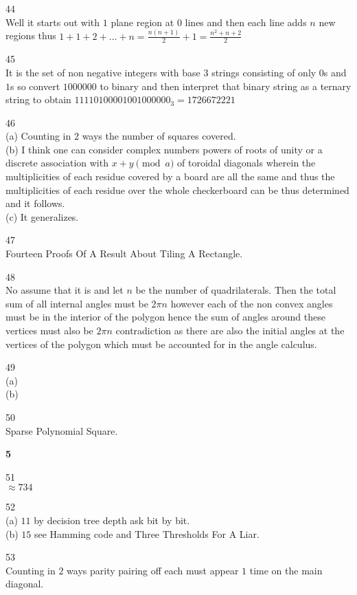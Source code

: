 44 \\
Well it starts out with $1$ plane region at $0$ lines and then each line adds $n$ new regions thus $1+1+2+\dots +n=\frac{n(n+1)}{2}+1=\boxed{\frac{n^2+n+2}{2}}$

45 \\
It is the set of non negative integers with base $3$ strings consisting of only $0$s and $1$s so convert $1000000$ to binary and then interpret that binary string as a ternary string to obtain $11110100001001000000_3=\boxed{1726672221}$

46 \\
(a) Counting in $2$ ways the number of squares covered. \\
(b) I think one can consider complex numbers powers of roots of unity or a discrete association with $x+y \pmod{a}$ of toroidal diagonals wherein the multiplicities of each residue covered by a board are all the same and thus the multiplicities of each residue over the whole checkerboard can be thus determined and it follows. \\
(c) It generalizes.

47 \\
Fourteen Proofs Of A Result About Tiling A Rectangle.

48 \\
$\boxed{\text{No}}$ assume that it is and let $n$ be the number of quadrilaterals. Then the total sum of all internal angles must be $2\pi n$ however each of the non convex angles must be in the interior of the polygon hence the sum of angles around these vertices must also be $2\pi n$ contradiction as there are also the initial angles at the vertices of the polygon which must be accounted for in the angle calculus.

49 \\
(a)  \\
(b) 

50 \\
Sparse Polynomial Square.

\newpage

\textbf{5}

51 \\
$\boxed{\approx 734}$

52 \\
(a) $\boxed{11}$ by decision tree depth ask bit by bit. \\
(b) $\boxed{15}$ see Hamming code and Three Thresholds For A Liar.

53 \\
Counting in $2$ ways parity pairing off each must appear $1$ time on the main diagonal.

